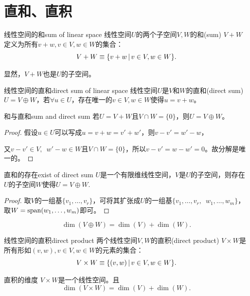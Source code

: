 \section{直和、直积}
\begin{definition}{线性空间的和}{sum of linear space}
	线性空间$U$的两个子空间$V,W$的和(sum) $V + W$定义为所有$v + w,v \in V,w \in W$的集合：
	\begin{equation}
		V + W \equiv \{v + w\,\vert\,v \in V,w \in W\}.
	\end{equation}
\end{definition}
显然，$V + W$也是$U$的子空间。
\begin{definition}{线性空间的直和}{direct sum of linear space}
	线性空间$U$是$V$和$W$的直和(direct sum) $U = V \oplus W$，若$\forall u \in U$，存在唯一的$v \in V,w \in W$使得$u = v + w$。
\end{definition}
\begin{theorem}{和与直和}{sum and direct sum}
	若$U = V + W$且$V \cap W = \{0\}$，则$U = V \oplus W$。
\end{theorem}
\begin{proof}
	假设$u \in U$可以写成$u = v + w = v' + w'$，则$v - v' = w' - w$，
	
	又$v - v' \in V,\enspace w' - w \in W$且$V \cap W = \{0\}$，所以$v - v' = w - w' = 0$。故分解是唯一的。
\end{proof}
\begin{theorem}{直和的存在}{exist of direct sum}
	$U$是一个有限维线性空间，$V$是$U$的子空间，则存在$U$的子空间$W$使得$U = V \oplus W.$
\end{theorem}
\begin{proof}
	取$V$的一组基$\{v_1,\ldots,v_r\}$，可将其扩张成$U$的一组基$\{v_1,\ldots,v_r,$\ $w_1,\ldots,w_m\}$，取$W = \operatorname{span}(w_1,\ldots,w_m)$即可。
\end{proof}
\begin{corollary}
	\begin{equation}
		\dim(V \oplus W) = \dim(V) + \dim(W).
	\end{equation}
\end{corollary}
\begin{definition}{线性空间的直积}{direct product}
	两个线性空间$V,W$的直积(direct product) $V \times W$是所有形如$(v,w),v \in V,w \in W$的元素的集合：
	\begin{equation}
		V \times W \equiv \{(v,w)\,\vert\,v \in V,w \in W\}.
	\end{equation}
\end{definition}
\begin{theorem}{直积的维度}{}
	$V \times W$是一个线性空间。且
	\begin{equation}
		\dim(V \times W) = \dim(V) + \dim(W).
	\end{equation}
\end{theorem}
